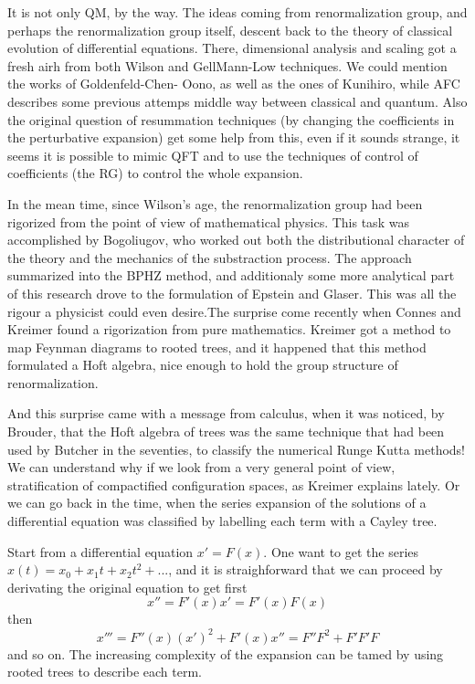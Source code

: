 \documentclass[a4paper,a4paper]{article}
\begin{document}
It is not only QM, by the way. The ideas coming from renormalization group, and perhaps 
the renormalization group itself, descent back to the theory of classical evolution of 
differential equations. There, dimensional analysis and scaling got a fresh airh from both 
Wilson and GellMann-Low techniques. We could mention the works of Goldenfeld-Chen-
Oono\cite{gco}, as well as the ones of Kunihiro, while AFC describes some previous 
attemps middle way between classical and quantum. Also the original question of 
resummation techniques (by changing the coefficients in the perturbative expansion) get 
some help from this, even if it  sounds strange, it seems it is possible to mimic QFT and to 
use the techniques of control of coefficients (the RG) to control the whole expansion.

In the mean time, since Wilson's age, the renormalization group had been rigorized from the 
point of view of mathematical physics. This task was accomplished by Bogoliugov, who 
worked out both the distributional character of the theory and the mechanics of the 
substraction process. The approach summarized into the BPHZ method, and additionaly 
some more analytical part of this research drove to the formulation of Epstein and Glaser. 
This was all the rigour a physicist could even desire.The surprise come recently when 
Connes and Kreimer found a rigorization from pure mathematics. Kreimer got a method to 
map Feynman diagrams to rooted trees, and it happened that this method formulated a Hoft 
algebra, nice enough to hold the group structure of renormalization. 

And this surprise came with a message from calculus, when it was noticed, by 
Brouder\cite{brouder}, that the Hoft algebra of trees was the same technique that had been 
used by Butcher in the seventies, to classify the numerical Runge Kutta methods! We can 
understand why if we look from a very general point of view, stratification of compactified 
configuration spaces, as Kreimer explains lately. Or we can go back in the time, when the 
series expansion of the solutions of a differential equation was classified by labelling each 
term with a Cayley  tree.

Start from a differential equation  $x'=F(x)$. One want to get the series
$x(t)= x_0 + x_1 t + x_2 t^2 + ...$, and it is straighforward that we can proceed
by derivating the original equation to get first
$$x''= F'(x) x'  =  F'(x) F(x)$$
then
$$x'''=F''(x) (x')^2 + F'(x) x'' = F'' F^2 + F' F' F $$
and so on. The increasing complexity of the expansion can be tamed by using rooted 
trees to describe each term\cite{conn.l}.
\end{document}
